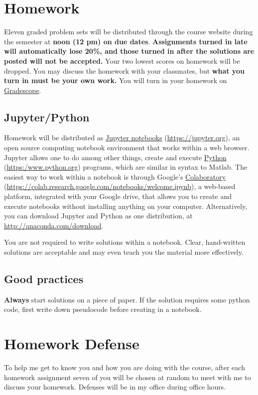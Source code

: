 \documentclass[11pt]{article}
\begin{document}
\section{Homework}
\label{sec:org0fdaae2}
Eleven graded problem sets will be distributed through the course website during the semester at \textbf{noon (12 pm) on due dates}.  \textbf{Assignments turned in late will automatically lose 20\%, and those turned in after the solutions are posted will not be accepted.}  Your two lowest scores on homework will be dropped.  You may discuss the homework with your classmates, but \textbf{what you turn in must be your own work.} You will turn in your homework on \href{https://www.gradescope.com/courses/933965}{Gradescope}.
\subsection{Jupyter/Python}
\label{sec:orga50432f}
Homework will be distributed as \href{https://jupyter.org/}{Jupyter notebooks} (\url{https://jupyter.org}), an open source computing notebook environment that works within a web browser. Jupyter allows one to do among other things, create and execute \href{https://www.python.org/}{Python} (\url{https:/www.python.org}) programs, which are similar in syntax to Matlab. The easiest way to work within a notebook is through Google's \href{https://colab.research.google.com/notebooks/welcome.ipynb}{Colaboratory} (\url{https://colab.research.google.com/notebooks/welcome.ipynb}), a web-based platform, integrated with your Google drive, that allows you to create and execute notebooks without installing anything on your computer. Alternatively, you can download Jupyter and Python as one distribution, at \url{http://anaconda.com/download}. 

You are not required to write solutions within a notebook. Clear, hand-written solutions are acceptable and may even teach you the material more effectively.
\subsection{Good practices}
\label{sec:orgf727cd4}
\textbf{Always} start solutions on a piece of paper. If the solution requires some python code, first write down pseudocode before creating in a notebook. 
\section{Homework Defense}
\label{sec:org9ce838a}
To help me get to know you and how you are doing with the course, after each homework assignment seven of you will be chosen at random to meet with me to discuss your homework. Defenses will be in my office during office hours.
\end{document}
